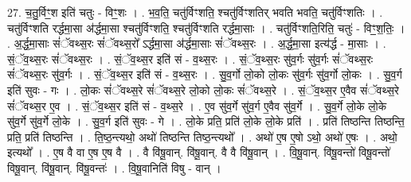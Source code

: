 \documentclass[17pt]{extarticle}
\begin{document}
27. च॒तु॒र्विꣳ॒॒श इति॑ चतुः - विꣳ॒॒शः । . भ॒व॒ति॒ चतु॑र्विꣳशति॒ श्चतु॑र्विꣳशतिर् भवति भवति॒ चतु॑र्विꣳशतिः । . चतु॑र्विꣳशति रर्द्धमा॒सा अ॑र्द्धमा॒सा श्चतु॑र्विꣳशति॒ श्चतु॑र्विꣳशति रर्द्धमा॒साः । . चतु॑र्विꣳशति॒रिति॒ चतुः॑ - विꣳ॒॒श॒तिः॒ । . अ॒र्द्ध॒मा॒साः सं॑ॅवथ्स॒रः सं॑ॅवथ्स॒रो᳚ ऽर्द्धमा॒सा अ॑र्द्धमा॒साः सं॑ॅवथ्स॒रः । . अ॒र्द्ध॒मा॒सा इत्य॑र्द्ध - मा॒साः । . सं॒ॅव॒थ्स॒रः सं॑ॅवथ्स॒रः । . सं॒ॅव॒थ्स॒र इति॑ सं - व॒थ्स॒रः । . सं॒ॅव॒थ्स॒रः सु॑व॒र्गः सु॑व॒र्गः सं॑ॅवथ्स॒रः सं॑ॅवथ्स॒रः सु॑व॒र्गः । . सं॒ॅव॒थ्स॒र इति॑ सं - व॒थ्स॒रः । . सु॒व॒र्गो लो॒को लो॒कः सु॑व॒र्गः सु॑व॒र्गो लो॒कः । . सु॒व॒र्ग इति॑ सुवः - गः । . लो॒कः सं॑ॅवथ्स॒रे सं॑ॅवथ्स॒रे लो॒को लो॒कः सं॑ॅवथ्स॒रे । . सं॒ॅव॒थ्स॒र ए॒वैव सं॑ॅवथ्स॒रे सं॑ॅवथ्स॒र ए॒व । . सं॒ॅव॒थ्स॒र इति॑ सं - व॒थ्स॒रे । . ए॒व सु॑व॒र्गे सु॑व॒र्ग ए॒वैव सु॑व॒र्गे । . सु॒व॒र्गे लो॒के लो॒के सु॑व॒र्गे सु॑व॒र्गे लो॒के । . सु॒व॒र्ग इति॑ सुवः - गे । . लो॒के प्रति॒ प्रति॑ लो॒के लो॒के प्रति॑ । . प्रति॑ तिष्ठन्ति तिष्ठन्ति॒ प्रति॒ प्रति॑ तिष्ठन्ति । . ति॒ष्ठ॒न्त्यथो॒ अथो॑ तिष्ठन्ति तिष्ठ॒न्त्यथो᳚ । . अथो॑ ए॒ष ए॒षो ऽथो॒ अथो॑ ए॒षः । . अथो॒ इत्यथो᳚ । . ए॒ष वै वा ए॒ष ए॒ष वै । . वै वि॑षू॒वान्. वि॑षू॒वान्. वै वै वि॑षू॒वान् । . वि॒षू॒वान्. वि॑षू॒वन्तो॑ विषू॒वन्तो॑ विषू॒वान्. वि॑षू॒वान्. वि॑षू॒वन्तः॑ । . वि॒षू॒वानिति॑ विषु - वान् । \newline
\end{document}
